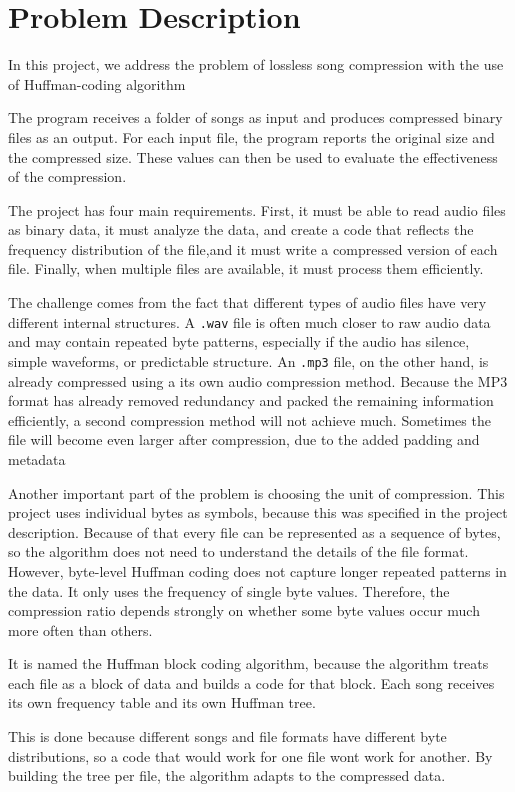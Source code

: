 \documentclass[11pt,a4paper]{article}
\begin{document}
\section{Problem Description}
In this project, we address the problem of lossless song compression with the use of Huffman-coding algorithm

The program receives a
folder of songs as input and produces compressed binary files as an output. For
each input file, the program reports the original size and the compressed size.
These values can then be used to evaluate the effectiveness of the compression.

The project has four main requirements. First, it must be able
to read audio files as binary data, it must analyze the data, and create
a code that reflects the frequency distribution of the file,and it must
write a compressed version of each file. Finally, when multiple files are
available, it must process them efficiently.

The challenge comes from the fact that different types of audio files have very
different internal structures. A \texttt{.wav} file is often much closer to raw
audio data and may contain repeated byte patterns, especially if the audio has
silence, simple waveforms, or predictable structure. An \texttt{.mp3} file, on
the other hand, is already compressed using a its own audio compression
method. Because the MP3 format has already removed redundancy and packed the
remaining information efficiently, a second compression method will not achieve much. Sometimes the file will become even larger after compression, due to the added padding and metadata

Another important part of the problem is choosing the unit of compression. This
project uses individual bytes as symbols, because this was specified in the project description. Because of that every file can be represented as a sequence of bytes, so the
algorithm does not need to understand the details of the file format. However,
byte-level Huffman coding does not capture longer repeated patterns in the data.
It only uses the frequency of single byte values. Therefore, the compression
ratio depends strongly on whether some byte values occur much more often than
others.

It is named the Huffman block coding algorithm, because the algorithm treats each file as a block of data and builds a code for that block.
Each song receives its own
frequency table and its own Huffman tree.

This is done because different songs and file formats have different byte distributions, so a code that would work for one file wont work for another. By building the tree per file, the algorithm adapts to the compressed data.
\end{document}
